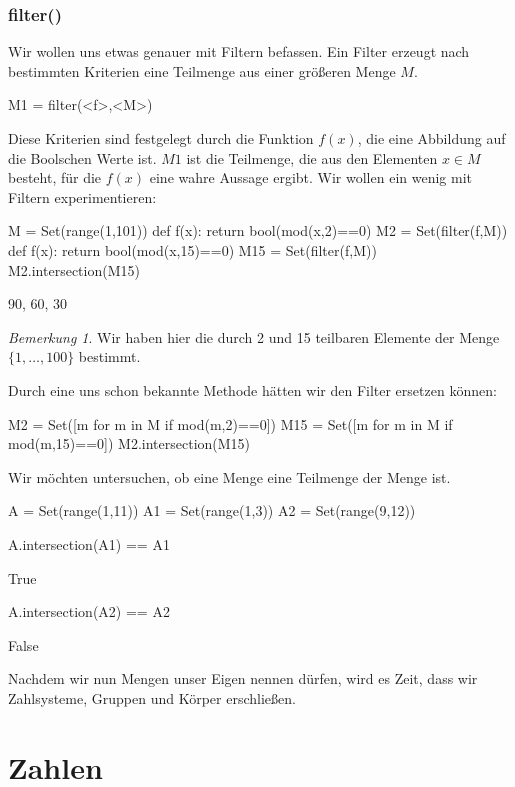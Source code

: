 \documentclass[fontsize=12pt,paper=a4,twoside,bibtotoc,idxtotoc,
liststotoc,pagesize,BCOR1.2cm,DIV15,chapterprefix,pagesize=pdftex]{scrbook}
\theoremstyle{plain}
\theoremstyle{definition}
\theoremstyle{remark}
\newtheorem{bem}[equation]{Bemerkung}
\begin{document}
\subsubsection{filter()}
Wir wollen uns etwas genauer mit Filtern befassen. Ein Filter erzeugt nach bestimmten Kriterien eine Teilmenge aus einer größeren Menge $M$.
\begin{sagein}
M1 = filter(<f>,<M>)
\end{sagein}
Diese Kriterien sind festgelegt durch die Funktion $f(x)$, die eine Abbildung auf die Boolschen Werte  ist. 
$M1$ ist die Teilmenge, die aus den Elementen $x\in M$ besteht, für die $f(x)$ eine wahre Aussage ergibt. Wir wollen ein wenig mit Filtern experimentieren:
\begin{sagein}
M = Set(range(1,101))
def f(x): return bool(mod(x,2)==0)
M2 = Set(filter(f,M))
def f(x): return bool(mod(x,15)==0)
M15 = Set(filter(f,M))
M2.intersection(M15)
\end{sagein} 
\begin{sage}
 {90, 60, 30}
\end{sage}
\begin{bem}
 Wir haben hier die durch 2 und 15 teilbaren Elemente der Menge $\{1,\ldots,100\}$ bestimmt.
\end{bem}
Durch eine uns schon bekannte Methode hätten wir den Filter ersetzen können:
\begin{sagein}
M2 = Set([m for m in M if mod(m,2)==0])
M15 = Set([m for m in M if mod(m,15)==0])
M2.intersection(M15)
\end{sagein}
Wir möchten untersuchen, ob eine Menge  eine Teilmenge der Menge  ist.
\begin{sagein}
A = Set(range(1,11))
A1 = Set(range(1,3))
A2 = Set(range(9,12))
\end{sagein}
\begin{sagein}
A.intersection(A1) == A1
\end{sagein}
\begin{sage}
  True
\end{sage}
\begin{sagein}
A.intersection(A2) == A2
\end{sagein}
\begin{sage}
  False
\end{sage}
Nachdem wir nun Mengen unser Eigen nennen dürfen, wird es Zeit, dass wir Zahlsysteme, Gruppen und Körper erschließen.
\section{Zahlen}
\end{document}
